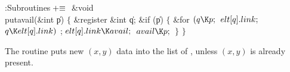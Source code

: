 \Y\B\4:Subroutines\X${}\mathrel+\equiv{}$\6
\&{void} \\{putavail}(\&{int} \|p)\1\1\2\2\6
${}\{{}$\1\6
\&{register} \&{int} \|q;\7
\&{if} (\|p)\5
${}\{{}$\1\6
\&{for} ${}(\|q\K\|p;{}$ ${}\\{elt}[\|q].\\{link};{}$ ${}\|q\K\\{elt}[\|q].%
\\{link}){}$\1\5
;\2\6
${}\\{elt}[\|q].\\{link}\K\\{avail};{}$\6
${}\\{avail}\K\|p;{}$\6
\4${}\}{}$\2\6
\4${}\}{}$\2\par
\fi

The  routine puts new $(x,y)$ data into the list of ,
unless $(x,y)$ is already present.

